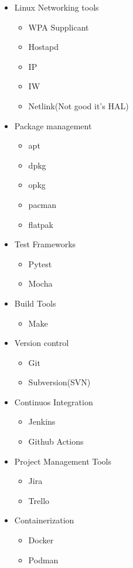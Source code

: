 \begin{itemize}
    \item Linux Networking tools
    \begin{itemize}
        \item WPA Supplicant
        \item Hostapd
        \item IP
        \item IW
        \item Netlink(Not good it's HAL)
    \end{itemize}

    \item Package management
    \begin{itemize}
        \item apt
        \item dpkg
        \item opkg
        \item pacman
        \item flatpak
    \end{itemize}

    \item Test Frameworks
    \begin{itemize}
        \item Pytest
        \item Mocha
    \end{itemize}

    \item Build Tools
    \begin{itemize}
        \item Make
    \end{itemize}

    \item Version control
    \begin{itemize}
        \item Git
        \item Subversion(SVN)
    \end{itemize}

    \item Continuos Integration
    \begin{itemize}
        \item Jenkins
        \item Github Actions
    \end{itemize}

    \item Project Management Tools
    \begin{itemize}
        \item Jira
        \item Trello
    \end{itemize}

    \item Containerization
    \begin{itemize}
        \item Docker
        \item Podman
    \end{itemize}

\end{itemize}

